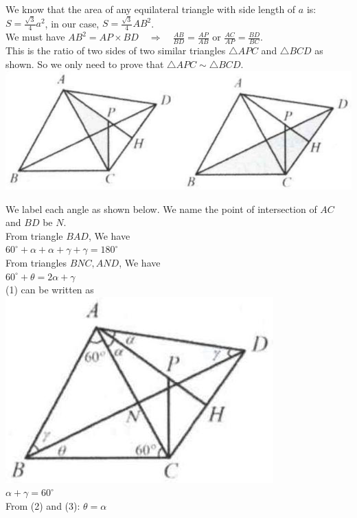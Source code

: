 \documentclass[10pt]{article}
\begin{document}
We know that the area of any equilateral triangle with side length of \(a\) is: \(S=\frac{\sqrt{3}}{4} a^{2}\), in our case, \(S=\frac{\sqrt{3}}{4} A B^{2}\).\\
We must have \(A B^{2}=A P \times B D \quad \Rightarrow \quad \frac{A B}{B D}=\frac{A P}{A B}\) or \(\frac{A C}{A P}=\frac{B D}{B C}\).\\
This is the ratio of two sides of two similar triangles \(\triangle A P C\) and \(\triangle B C D\) as shown. So we only need to prove that \(\triangle A P C \sim \triangle B C D\).\\
\includegraphics[max width=\textwidth, center]{2025_04_17_97bc1f7e44d93c271a88g-201}

We label each angle as shown below. We name the point of intersection of \(A C\) and \(B D\) be \(N\).\\
From triangle \(B A D\), We have\\
\(60^{\circ}+\alpha+\alpha+\gamma+\gamma=180^{\circ}\)\\
From triangles \(B N C, A N D\), We have\\
\(60^{\circ}+\theta=2 \alpha+\gamma\)\\
(1) can be written as\\
\includegraphics[max width=\textwidth, center]{2025_04_17_97bc1f7e44d93c271a88g-201(1)}\\
\(\alpha+\gamma=60^{\circ}\)\\
From (2) and (3): \(\theta=\alpha\)
\end{document}
